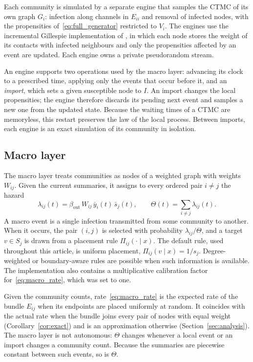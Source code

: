 \documentclass[a4paper,fleqn]{cas-sc}
\newcommand{\ibar}{\bar{y}}
\newcommand{\sbar}{\bar{s}}
\begin{document}
Each community is simulated by a separate engine that samples the CTMC of its own graph $G_i$: infection along channels in $E_{ii}$ and removal of infected nodes, with the propensities of~\eqref{eq:full_generator} restricted to $V_i$. The engines use the incremental Gillespie implementation of \citet{kuryliak2025simulating}, in which each node stores the weight of its contacts with infected neighbours and only the propensities affected by an event are updated. Each engine owns a private pseudorandom stream.

An engine supports two operations used by the macro layer: advancing its clock to a prescribed time, applying only the events that occur before it, and an \emph{import}, which sets a given susceptible node to $I$. An import changes the local propensities; the engine therefore discards its pending next event and samples a new one from the updated state. Because the waiting times of a CTMC are memoryless, this restart preserves the law of the local process. Between imports, each engine is an exact simulation of its community in isolation.

\subsection{Macro layer}
\label{sec:macro}

The macro layer treats communities as nodes of a weighted graph with weights $W_{ij}$. Given the current summaries, it assigns to every ordered pair $i\neq j$ the hazard
\begin{equation}
\label{eq:macro_rate}
\lambda_{ij}(t)=\beta_{\mathrm{out}}\,W_{ij}\,\ibar_i(t)\,\sbar_j(t),
\qquad
\Theta(t)=\sum_{i\neq j}\lambda_{ij}(t).
\end{equation}
A macro event is a single infection transmitted from some community to another. When it occurs, the pair $(i,j)$ is selected with probability $\lambda_{ij}/\Theta$, and a target $v\in S_j$ is drawn from a placement rule $\Pi_{ij}(\cdot\mid x)$. The default rule, used throughout this article, is uniform placement, $\Pi_{ij}(v\mid x)=1/s_j$. Degree-weighted or boundary-aware rules are possible when such information is available. The implementation also contains a multiplicative calibration factor for~\eqref{eq:macro_rate}, which was set to one.

Given the community counts, rate~\eqref{eq:macro_rate} is the expected rate of the bundle $E_{ij}$ when its endpoints are placed uniformly at random. It coincides with the actual rate when the bundle joins every pair of nodes with equal weight (Corollary~\ref{cor:exact}) and is an approximation otherwise (Section~\ref{sec:analysis}). The macro layer is not autonomous: $\Theta$ changes whenever a local event or an import changes a community count. Because the summaries are piecewise constant between such events, so is $\Theta$.
\end{document}
